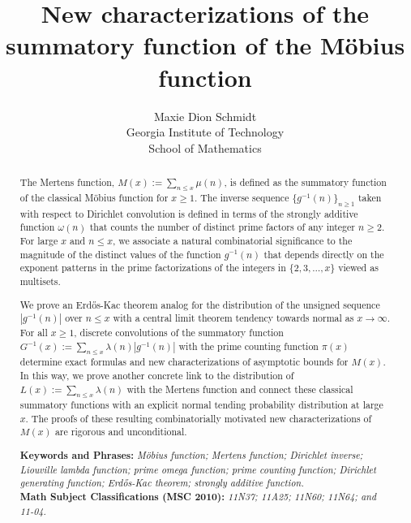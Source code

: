 \documentclass[11pt,reqno,a4letter]{article}
\title{
       \LARGE{
       New characterizations of the summatory function of the M\"obius function 
       } 
}
\author{{\Large Maxie Dion Schmidt} \\ 
        {\normalsize Georgia Institute of Technology} \\[0.025cm] 
        {\normalsize School of Mathematics} 
}
\numberwithin{figure}{section}
\numberwithin{table}{section}
\theoremstyle{plain}
\numberwithin{theorem}{section}
\theoremstyle{definition}
\begin{document}
 

\maketitle

\begin{abstract} 
The Mertens function, $M(x) := \sum_{n \leq x} \mu(n)$, is 
defined as the summatory function of the classical M\"obius function for $x \geq 1$. 
The inverse sequence $\{g^{-1}(n)\}_{n \geq 1}$ 
taken with respect to Dirichlet convolution is defined in terms of the 
strongly additive function $\omega(n)$ that counts the 
number of distinct prime factors of any integer $n \geq 2$. 
For large $x$ and $n \leq x$, we associate a natural combinatorial 
significance to the magnitude of the distinct values of the 
function $g^{-1}(n)$ that depends directly on the exponent patterns in the 
prime factorizations of the integers in $\{2,3,\ldots,x\}$ viewed as multisets. 

We prove an Erd\H{o}s-Kac theorem analog for the distribution of the 
unsigned sequence $|g^{-1}(n)|$ over $n \leq x$ with a central limit theorem 
tendency towards normal as $x \rightarrow \infty$. 
For all $x \geq 1$, discrete convolutions of the summatory function 
$G^{-1}(x) := \sum_{n \leq x} \lambda(n) |g^{-1}(n)|$ with 
the prime counting function $\pi(x)$ determine 
exact formulas and new characterizations of asymptotic bounds for $M(x)$. 
In this way, we prove another concrete link to the distribution of  
$L(x) := \sum_{n \leq x} \lambda(n)$ with the Mertens function and connect these classical 
summatory functions with an explicit normal tending 
probability distribution at large $x$. 
The proofs of these resulting combinatorially motivated new characterizations of $M(x)$ 
are rigorous and unconditional. 

\bigskip 
\noindent
\textbf{Keywords and Phrases:} {\it M\"obius function; Mertens function; 
                                    Dirichlet inverse; Liouville lambda function; prime omega function; 
                                    prime counting function; Dirichlet generating function; 
                                    Erd\H{o}s-Kac theorem; strongly additive function. } \\ 
\textbf{Math Subject Classifications (MSC 2010):} {\it 11N37; 11A25; 11N60; 11N64; and 11-04. } 
\end{abstract} 
\end{document}
